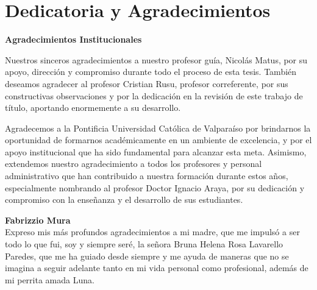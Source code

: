 \chapter*{Dedicatoria y Agradecimientos}
\label{cha:dedicatoria}

\begin{small} 
\itshape 
    \vspace{1em}
    \begin{center}
        \textbf{Agradecimientos Institucionales} \\[0.5em]
        \begin{minipage}{0.9\textwidth}
            \centering
            Nuestros sinceros agradecimientos a nuestro profesor guía, Nicolás Matus, por su apoyo, dirección y compromiso durante todo el proceso de esta tesis. También deseamos agradecer al profesor Cristian Rusu, profesor correferente, por sus constructivas observaciones y por la dedicación en la revisión de este trabajo de título, aportando enormemente a su desarrollo.

            Agradecemos a la Pontificia Universidad Católica de Valparaíso por brindarnos la oportunidad de formarnos académicamente en un ambiente de excelencia, y por el apoyo institucional que ha sido fundamental para alcanzar esta meta. Asimismo, extendemos nuestro agradecimiento a todos los profesores y personal administrativo que han contribuido a nuestra formación durante estos años, especialmente nombrando al profesor Doctor Ignacio Araya, por su dedicación y compromiso con la enseñanza y el desarrollo de sus estudiantes.
        \end{minipage}
    \end{center}
    
    \vspace{1em} %

    \noindent\textbf{Fabrizzio Mura} \\
    \nopagebreak
    \indent Expreso mis más profundos agradecimientos a mi madre, que me impulsó a ser todo lo que fui, soy y siempre seré, la señora Bruna Helena Rosa Lavarello Paredes, que me ha guiado desde siempre y me ayuda de maneras que no se imagina a seguir adelante tanto en mi vida personal como profesional, además de mi perrita amada Luna.


\end{small}
